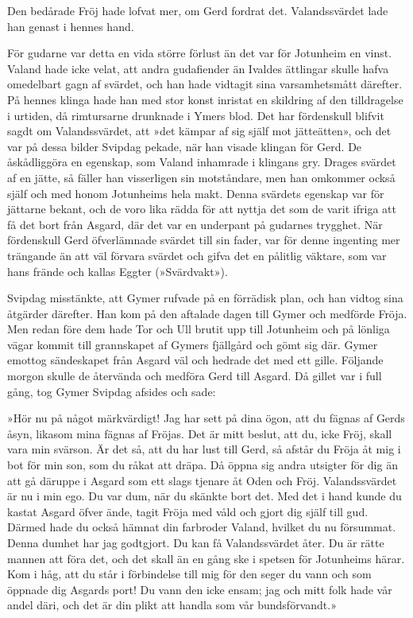 Den bedårade Fröj hade lofvat mer, om Gerd fordrat det. Valandssvärdet
lade han genast i hennes hand.

För gudarne var detta en vida större förlust än det var för Jotunheim en
vinst. Valand hade icke velat, att andra gudafiender än Ivaldes
ättlingar skulle hafva omedelbart gagn af svärdet, och han hade vidtagit
sina varsamhetsmått därefter. På hennes klinga hade han med stor konst
inristat en skildring af den tilldragelse i urtiden, då rimtursarne
drunknade i Ymers blod. Det har fördenskull blifvit sagdt om
Valandssvärdet, att »det kämpar af sig själf mot jätteätten», och det
var på dessa bilder Svipdag pekade, när han visade klingan för Gerd. De
åskådliggöra en egenskap, som Valand inhamrade i klingans gry. Drages
svärdet af en jätte, så fäller han visserligen sin motståndare, men han
omkommer också själf och med honom Jotunheims hela makt. Denna svärdets
egenskap var för jättarne bekant, och de voro lika rädda för att nyttja
det som de varit ifriga att få det bort från Asgard, där det var en
underpant på gudarnes trygghet. När fördenskull Gerd öfverlämnade
svärdet till sin fader, var för denne ingenting mer trängande än att väl
förvara svärdet och gifva det en pålitlig väktare, som var hans frände
och kallas Eggter (»Svärdvakt»).

Svipdag misstänkte, att Gymer rufvade på en förrädisk plan, och han
vidtog sina åtgärder därefter. Han kom på den aftalade dagen till Gymer
och medförde Fröja. Men redan före dem hade Tor och Ull brutit upp till
Jotunheim och på lönliga vägar kommit till grannskapet af Gymers
fjällgård och
gömt sig där. Gymer emottog sändeskapet från Asgard väl och hedrade det
med ett gille. Följande morgon skulle de återvända och medföra Gerd till
Asgard. Då gillet var i full gång, tog Gymer Svipdag afsides och sade:

»Hör nu på något märkvärdigt! Jag har sett på dina ögon, att du fägnas
af Gerds åsyn, likasom mina fägnas af Fröjas. Det är mitt beslut, att
du, icke Fröj, skall vara min svärson. Är det så, att du har lust till
Gerd, så afstår du Fröja åt mig i bot för min son, som du råkat att
dräpa. Då öppna sig andra utsigter för dig än att gå däruppe i Asgard
som ett slags tjenare åt Oden och Fröj. Valandssvärdet är nu i min ego.
Du var dum, när du skänkte bort det. Med det i hand kunde du kastat
Asgard öfver ände, tagit Fröja med våld och gjort dig själf till gud.
Därmed hade du också hämnat din farbroder Valand, hvilket du nu
försummat. Denna dumhet har jag godtgjort. Du kan få Valandssvärdet
åter. Du är rätte mannen att föra det, och det skall än en gång ske i
spetsen för Jotunheims härar. Kom i håg, att du står i förbindelse till
mig för den seger du vann och som öppnade dig Asgards port! Du vann den
icke ensam; jag och mitt folk hade vår andel däri, och det är din plikt
att handla som vår bundsförvandt.»

